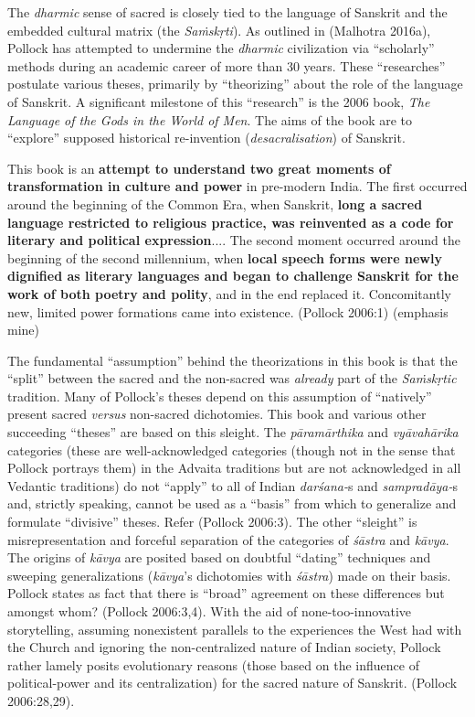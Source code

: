The \textit{dharmic} sense of sacred is closely tied to the language of Sanskrit and the embedded cultural matrix (the \textit{Saṁskṛti}). As outlined in (Malhotra 2016a), Pollock has attempted to undermine the \textit{dharmic} civilization via “scholarly” methods during an academic career of more than 30 years. These “researches” postulate various theses, primarily by “theorizing” about the role of the language of Sanskrit. A significant milestone of this “research” is the 2006 book, \textit{The Language of the Gods in the World of Men}. The aims of the book are to “explore” supposed historical re-invention (\textit{desacralisation}) of Sanskrit.

\begin{myquote}
This book is an \textbf{attempt to understand two great moments of transformation in culture and power} in pre-modern India. The first occurred around the beginning of the Common Era, when Sanskrit, \textbf{long a sacred language restricted to religious practice, was reinvented as a code for literary and political expression}.... The second moment occurred around the beginning of the second millennium, when \textbf{local speech forms were newly dignified as literary languages and began to challenge Sanskrit for the work of both poetry and polity}, and in the end replaced it. Concomitantly new, limited power formations came into existence. \hfill (Pollock 2006:1) (emphasis mine)
\end{myquote}

The fundamental “assumption” behind the theorizations in this book is that the “split” between the sacred and the non-sacred was \textit{already} part of the \textit{Saṁskṛtic} tradition. Many of Pollock's theses depend on this assumption of “natively” present sacred \textit{versus} non-sacred dichotomies. This book and various other succeeding “theses” are based on this sleight. The \textit{pāramārthika} and \textit{vyāvahārika} categories (these are well-acknowledged categories (though not in the sense that Pollock portrays them) in the Advaita traditions but are not acknowledged in all Vedantic traditions) do not “apply” to all of Indian \textit{darśana-}s\textit{ }and \textit{sampradāya-}s and, strictly speaking, cannot be used as a “basis” from which to generalize and formulate “divisive” theses. Refer (Pollock 2006:3). The other “sleight” is misrepresentation and forceful separation of the categories of \textit{śāstra} and \textit{kāvya}. The origins of \textit{kāvya} are posited based on doubtful “dating” techniques and sweeping generalizations (\textit{kāvya}'s dichotomies with \textit{śāstra}) made on their basis. Pollock states as fact that there is “broad” agreement on these differences but amongst whom? (Pollock 2006:3,4). With the aid of none-too-innovative storytelling, assuming nonexistent parallels to the experiences the West had with the Church and ignoring the non-centralized nature of Indian society, Pollock rather lamely posits evolutionary reasons (those based on the influence of political-power and its centralization) for the sacred nature of Sanskrit. (Pollock 2006:28,29).

